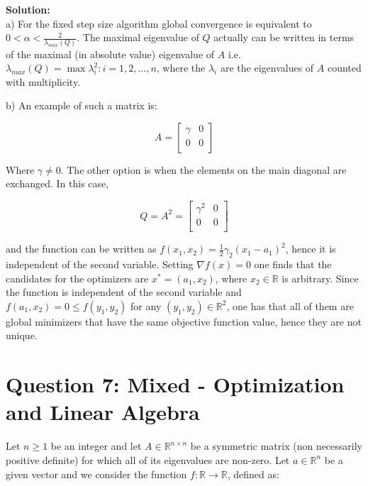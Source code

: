 \documentclass[12pt]{article}
\begin{document}
	\begin{framed}
		\textbf{Solution:}\\
		a) For the fixed step size algorithm global convergence is equivalent to $0 < \alpha < \frac{2}{\lambda_{max}(Q)}$. The maximal eigenvalue of $Q$ actually can be written in terms of the maximal (in absolute value) eigenvalue of $A$ i.e. $\lambda_{max}(Q) = \max {\lambda_i^2 : i = 1, 2, \dots , n}$, where the $\lambda_i$ are the eigenvalues of $A$ counted with multiplicity.
		
		b) An example of such a matrix is:
		
		\begin{equation}
			A = \begin{bmatrix}
				\gamma & 0 \\
				0 & 0 \\
			\end{bmatrix}
		\end{equation}
		
		Where $\gamma \neq 0$. The other option is when the elements on the main diagonal are exchanged. In this case,
		
		\begin{equation}
			Q = A^2 = \begin{bmatrix}
									\gamma^2 & 0 \\
									0 & 0 \\
								\end{bmatrix}
		\end{equation}
		
		and the function can be written as $f(x_1,x_2) = \frac{1}{2} \gamma_2 (x_1 - a_1)^2$, hence it is independent of the second variable. Setting $\nabla f(x) = 0$ one finds that the candidates for the optimizers are $x^* = (a_1,x_2)$, where $x_2 \in \mathbb{R}$ is arbitrary. Since the function is independent of the second variable and $f(a_1,x_2) = 0 \leq f(y_1,y_2)$ for any $(y_1, y_2) \in \mathbb{R}^2$, one has that all of them are global minimizers that have the same objective function value, hence they are not unique.
		
	\end{framed}
	
	\section*{Question 7: Mixed - Optimization and Linear Algebra}
	Let $n \geq 1$ be an integer and let $A \in \mathbb{R}^{n \times n}$ be a symmetric matrix (non necessarily positive definite) for which all of its eigenvalues are non-zero. Let $a \in \mathbb{R}^n$ be a given vector and we consider the function $f:\mathbb{R} \rightarrow \mathbb{R}$, defined as:
\end{document}
